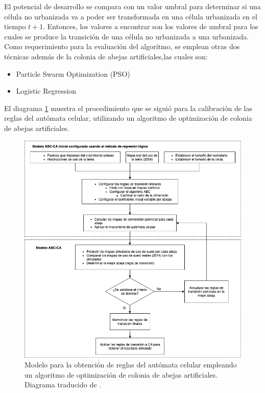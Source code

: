 El potencial de desarrollo se compara con un valor umbral para determinar si una célula no urbanizada va a poder ser transformada en una célula urbanizada en el tiempo $t+1$. Entonces, los valores a encontrar son los valores de umbral para los cuales se produce la transición de una célula no urbanizada a una urbanizada.
\\
Como requerimiento para la evaluación del algoritmo, se emplean otras dos técnicas además de la colonia de abejas artificiales,las cuales son:
\begin{itemize}
	\item Particle Swarm Optimization (PSO)
	\item Logistic Regression
\end{itemize}

El diagrama \ref{fig:abc} muestra el procedimiento que se siguió para la calibración de las reglas del autómata celular, utilizando un algoritmo de optimización de colonia de abejas artificiales.

\begin{figure}[H]
	\centering
	\includegraphics[width=\linewidth]{fig/abejas}
	\caption{Modelo para la obtención de reglas del autómata celular empleando un algoritmo de optimización de colonia de abejas artificiales. Diagrama traducido de \cite{naghibi2016discovery}.}
	\label{fig:abc}
\end{figure}

